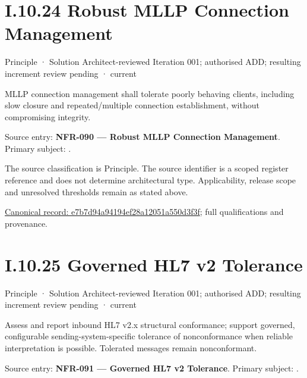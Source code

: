 \section*{I.10.24 Robust MLLP Connection Management}
\label{navigation:I.10.24}

\label{element:e7b7d94a94194ef28a12051a550d3f3f}
{\small Principle · Solution Architect-reviewed Iteration 001; authorised ADD; resulting increment review pending · current}\par

MLLP connection management shall tolerate poorly behaving clients, including slow closure and repeated/multiple connection establishment, without compromising integrity.



Source entry: \textbf{NFR-090 — Robust MLLP Connection Management}. Primary subject: \texttt{}.



The source classification is Principle. The source identifier is a scoped register reference and does not determine architectural type. Applicability, release scope and unresolved thresholds remain as stated above.


{\footnotesize \href{../../../../../../../continuum/motivation/principle/e7b7d94a94194ef28a12051a550d3f3f.md}{Canonical record: e7b7d94a94194ef28a12051a550d3f3f}; full qualifications and provenance.}\par
\section*{I.10.25 Governed HL7 v2 Tolerance}
\label{navigation:I.10.25}

\label{element:0968fc163ae54514bc1f02471fe6d866}
{\small Principle · Solution Architect-reviewed Iteration 001; authorised ADD; resulting increment review pending · current}\par

Assess and report inbound HL7 v2.x structural conformance; support governed, configurable sending-system-specific tolerance of nonconformance when reliable interpretation is possible. Tolerated messages remain nonconformant.



Source entry: \textbf{NFR-091 — Governed HL7 v2 Tolerance}. Primary subject: \texttt{}.



